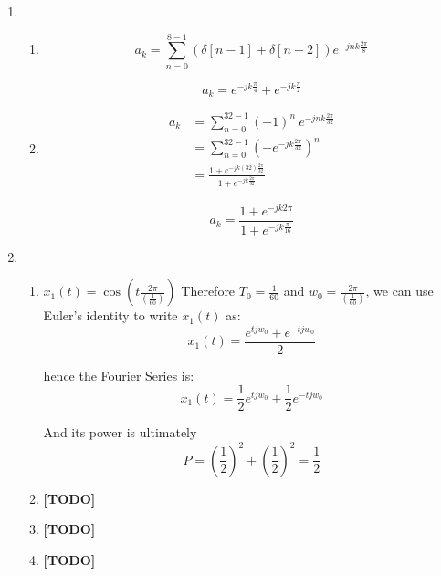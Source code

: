 \documentclass[]{article}
\begin{document}
\begin{enumerate}
\def\labelenumi{\arabic{enumi}.}
\setcounter{enumi}{4}
\item
  \begin{enumerate}
  \def\labelenumii{\alph{enumii}.}
  \item
    \[
        a_k = \sum_{n = 0}^{8 - 1} (\delta[n - 1] + \delta[n - 2]) e^{-j n k \frac{2\pi}{8}}
    \]

    \[
        \boxed{a_k = e^{-jk\frac{\pi}{4}} + e^{-jk\frac{\pi}{2}}}
    \]
  \item
    \begin{align*}
        a_k &= \sum_{n = 0}^{32 - 1} (-1)^n ~ e^{-j n k \frac{2\pi}{32}} \\
            &= \sum_{n = 0}^{32 - 1} (-e^{-j k \frac{2\pi}{32}})^n \\
            &= \frac{1 + e^{-jk(32) \frac{2\pi}{32} }}{1 + e^{-jk\frac{2\pi}{32}}}
    \end{align*}

    \[
        \boxed{a_k = \frac{1 + e^{-jk 2\pi}}{1 + e^{-jk\frac{\pi}{16}}}}
    \]
  \end{enumerate}
\item
  \begin{enumerate}
  \def\labelenumii{\alph{enumii}.}
  \item
    \(x_1(t) = \cos\left(t \frac{2 \pi}{(\frac{1}{60})}\right)\)
    Therefore \(T_0 = \frac{1}{60}\) and
    \(w_0 = \frac{2 \pi}{(\frac{1}{60})}\), we can use Euler's identity
    to write \(x_1(t)\) as: \[
        x_1(t) = \frac{e^{t j w_0} + e^{-t j w_0}}{2}
    \]

    hence the Fourier Series is: \[
        x_1(t) = \frac{1}{2}e^{t j w_0} + \frac{1}{2}e^{- t j w_0}
    \]

    And its power is ultimately \[
        \boxed{P = \left( \frac{1}{2} \right)^2 + \left( \frac{1}{2} \right)^2 = \frac{1}{2}}
    \]
  \item
    \textbf{{[}TODO{]}}
  \item
    \textbf{{[}TODO{]}}
  \item
    \textbf{{[}TODO{]}}
  \end{enumerate}
\end{enumerate}
\end{document}
